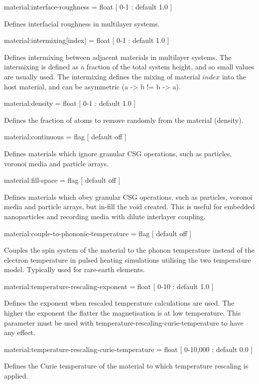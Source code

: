 {\zicf material:interface-roughness = float [ 0-1 : default 1.0 ]} Defines interfacial roughness in multilayer systems.

{\zicf material:intermixing[index] = float [ 0-1 : default 1.0 ]} Defines intermixing between adjacent materials in multilayer systems. The intermixing is defined as a fraction of the total system height, and so small values are usually used. The intermixing defines the mixing of material $index$ into the host material, and can be asymmetric (a -> b != b -> a).

{\zicf material:density = float [ 0-1 : default 1.0 ]} Defines the fraction of atoms to remove randomly from the material (density).

{\zicf material:continuous = flag [ default off ]} Defines materials which ignore granular CSG operations, such as particles, voronoi media and particle arrays.

{\zicf material:fill-space = flag [ default off ]} Defines materials which obey granular CSG operations, such as particles, voronoi media and particle arrays, but in-fill the void created. This is useful for embedded nanoparticles and recording media with dilute interlayer coupling.

{\zicf material:couple-to-phononic-temperature = flag [ default off ]} Couples the spin system of the material to the phonon temperature instead of the electron temperature in pulsed heating simulations utilising the two temperature model. Typically used for rare-earth elements.

{\zicf material:temperature-rescaling-exponent = float [ 0-10 : default 1.0 ]} Defines the exponent when rescaled temperature calculations are used. The higher the exponent the flatter the magnetisation is at low temperature. This parameter must be used with temperature-rescaling-curie-temperature to have any effect.

{\zicf material:temperature-rescaling-curie-temperature = float [ 0-10,000 : default 0.0 ]} Defines the Curie temperature of the material to which temperature rescaling is applied.

